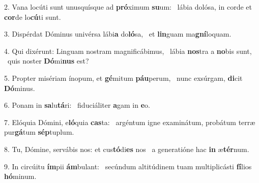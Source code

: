 2. Vana locúti sunt unusquísque ad \textbf{pró}ximum \textbf{su}um: \ast\  lábia dolósa, in corde et \textbf{cor}de lo\textbf{cú}ti sunt.\

3. Dispérdat Dóminus univérsa lábi\textbf{a} do\textbf{ló}sa, \ast\  et \textbf{lin}guam ma\textbf{gní}loquam.\

4. Qui dixérunt: Linguam nostram magnificábimus, \dag\  lábia \textbf{nos}tra a \textbf{no}bis sunt, \ast\  quis noster \textbf{Dó}mi\textbf{nus} est?\

5. Propter misériam ínopum, et \textbf{gé}mitum \textbf{páu}perum, \ast\  nunc exsúrgam, \textbf{di}cit \textbf{Dó}minus.\

6. Ponam in \textbf{sa}lu\textbf{tá}ri: \ast\  fiduciáliter \textbf{a}gam in \textbf{e}o.\

7. Elóquia Dómini, e\textbf{ló}quia \textbf{cas}ta: \ast\  argéntum igne examinátum, probátum terræ pur\textbf{gá}tum \textbf{sép}tuplum.\

8. Tu, Dómine, servábis nos: et cus\textbf{tó}di\textbf{es} nos \ast\  a generatióne hac \textbf{in} æ\textbf{tér}num.\

9. In circúitu \textbf{ím}pii \textbf{ám}bulant: \ast\  secúndum altitúdinem tuam multiplicásti \textbf{fí}lios \textbf{hó}minum.\

